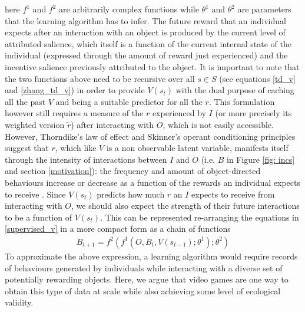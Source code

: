 here $f^{1}$ and $f^{2}$ are arbitrarily complex functions while $\theta^{1}$ and $\theta^{2}$ are parameters that the learning algorithm has to infer. The future reward that an individual expects after an interaction with an object is produced by the current level of attributed salience, which  itself is a function of the current internal state of the individual (expressed through the amount of reward just experienced) and the incentive salience previously attributed to the object. It is important to note that the two functions above need to be recursive over all $s \in S$ (see equations \ref{td_v} and \ref{zhang_td_v}) in order to provide $V(s_{t})$ with the dual purpose of caching all the past $V$ and being a suitable predictor for all the $r$. This formulation however still requires a measure of the $r$ experienced by $I$ (or more precisely its weighted version $\tilde{r}$) after interacting with $O$, which is not easily accessible. However, Thorndike's law of effect \cite{thorndike1927law} and Skinner's operant conditioning principles \cite{skinner1965science} suggest that $r$, which  like $V$ is a non observable latent variable, manifests itself through the intensity of interactions between $I$ and $O$ (i.e. $B$ in Figure \ref{fig: incs} and section \ref{motivation}): the frequency and amount of object-directed behaviours increase or decrease as a function of the rewards an individual expects to receive \cite{berridge2004motivation,schultz2017reward}. Since $V(s_{t})$ predicts how much $r$ an $I$ expects to receive from interacting with $O$, we should also expect the strength of their future interactions to be a function of $V(s_{t})$. This can be represented re-arranging the equations in \ref{supervised_v} in a more compact form as a chain of functions
\begin{align}
\label{supervised_b}
    B_{t+1} = f^{2}(f^{1}(O, B_{t}, V(s_{t-1}); \theta^{1});  \theta^{2})
\end{align}
To approximate the above expression, a learning algorithm would require records of behaviours generated by individuals while interacting with a diverse set of potentially rewarding objects. Here, we argue that video games are one way to obtain this type of data at scale while also achieving some level of ecological validity.


